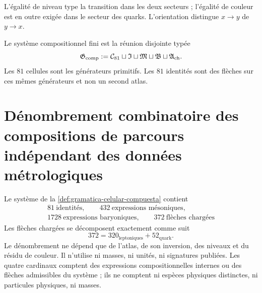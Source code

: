 L’égalité de niveau type la transition dans les deux secteurs ; l’égalité de couleur est en outre exigée dans le secteur des quarks. L’orientation distingue \(x\to y\) de \(y\to x\).

\begin{definition}
\label{def:gramatica-celular-compuesta} Le système compositionnel fini est la réunion disjointe typée
\[
 \mathfrak G_{\rm comp}
 :=
 \mathcal C_{81}
 \sqcup\mathfrak I
 \sqcup\mathfrak M
 \sqcup\mathfrak B
 \sqcup\mathfrak A_{\rm ch}.
\]
Les \(81\) cellules sont les générateurs primitifs. Les \(81\) identités sont des flèches sur ces mêmes générateurs et non un second atlas.
\end{definition}

\section{Dénombrement combinatoire des compositions de parcours indépendant des données métrologiques}
\label{sec:censo-composicional-rev6}

\begin{theorem}
\label{thm:censo-gramatica-composicional-rev6} Le système de la \cref{def:gramatica-celular-compuesta} contient
\[
 \boxed{\begin{gathered}
        81\ \text{identités},\qquad
        432\ \text{expressions mésoniques},\\
        1728\ \text{expressions baryoniques},\qquad
        372\ \text{flèches chargées}
 \end{gathered}}
\]
Les flèches chargées se décomposent exactement comme suit
\[
 372=320_{\text{leptoniques}}+52_{\text{quark}}.
\]
Le dénombrement ne dépend que de l’atlas, de son inversion, des niveaux et du résidu de couleur. Il n’utilise ni masses, ni unités, ni signatures publiées. Les quatre cardinaux comptent des expressions compositionnelles internes ou des flèches admissibles du système ; ils ne comptent ni espèces physiques distinctes, ni particules physiques, ni masses.
\end{theorem}


